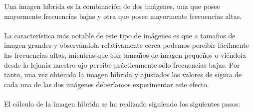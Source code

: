 Una imagen híbrida es la combinación de dos imágenes, una que posee mayormente frecuencias bajas y otra que posee mayormente frecuencias altas.\\ 
\\
La característica más notable de este tipo de imágenes es que a tamaños de imagen grandes y observándola relativamente cerca podemos percibir fácilmente las frecuencias altas, mientras que con tamaños de imagen pequeños o viéndola desde la lejanía nuestro ojo percibe prácticamente sólo frecuencias bajas. Por tanto, una vez obtenida la imagen híbrida y ajustados los valores de sigma de cada una de las dos imágenes deberíamos experimentar este efecto.\\
\\

El cálculo de la imagen hibrida se ha realizado siguiendo los siguientes pasos:

